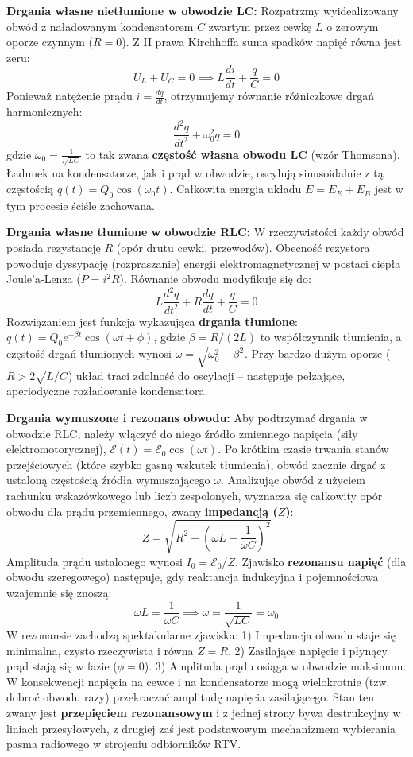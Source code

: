 \documentclass[11pt, a4paper]{article}
\begin{document}
\textbf{Drgania własne nietłumione w obwodzie LC:}
Rozpatrzmy wyidealizowany obwód z naładowanym kondensatorem $C$ zwartym przez cewkę $L$ o zerowym oporze czynnym ($R=0$). Z II prawa Kirchhoffa suma spadków napięć równa jest zeru:
\[
U_L + U_C = 0 \implies L \frac{di}{dt} + \frac{q}{C} = 0
\]
Ponieważ natężenie prądu $i = \frac{dq}{dt}$, otrzymujemy równanie różniczkowe drgań harmonicznych:
\[
\frac{d^2q}{dt^2} + \omega_0^2 q = 0
\]
gdzie $\omega_0 = \frac{1}{\sqrt{LC}}$ to tak zwana \textbf{częstość własna obwodu LC} (wzór Thomsona). Ładunek na kondensatorze, jak i prąd w obwodzie, oscylują sinusoidalnie z tą częstością $q(t) = Q_0 \cos(\omega_0 t)$. Całkowita energia układu $E = E_E + E_B$ jest w tym procesie ściśle zachowana.

\textbf{Drgania własne tłumione w obwodzie RLC:}
W rzeczywistości każdy obwód posiada rezystancję $R$ (opór drutu cewki, przewodów). Obecność rezystora powoduje dyssypację (rozpraszanie) energii elektromagnetycznej w postaci ciepła Joule'a-Lenza ($P = i^2 R$). Równanie obwodu modyfikuje się do:
\[
L \frac{d^2q}{dt^2} + R \frac{dq}{dt} + \frac{q}{C} = 0
\]
Rozwiązaniem jest funkcja wykazująca \textbf{drgania tłumione}: $q(t) = Q_0 e^{-\beta t} \cos(\omega t + \phi)$, gdzie $\beta = R/(2L)$ to współczynnik tłumienia, a częstość drgań tłumionych wynosi $\omega = \sqrt{\omega_0^2 - \beta^2}$. Przy bardzo dużym oporze ($R > 2\sqrt{L/C}$) układ traci zdolność do oscylacji – następuje pełzające, aperiodyczne rozładowanie kondensatora.

\textbf{Drgania wymuszone i rezonans obwodu:}
Aby podtrzymać drgania w obwodzie RLC, należy włączyć do niego źródło zmiennego napięcia (siły elektromotorycznej), $\mathcal{E}(t) = \mathcal{E}_0 \cos(\omega t)$. Po krótkim czasie trwania stanów przejściowych (które szybko gasną wskutek tłumienia), obwód zacznie drgać z ustaloną częstością źródła wymuszającego $\omega$. Analizując obwód z użyciem rachunku wskazówkowego lub liczb zespolonych, wyznacza się całkowity opór obwodu dla prądu przemiennego, zwany \textbf{impedancją ($Z$)}:
\[
Z = \sqrt{R^2 + \left(\omega L - \frac{1}{\omega C}\right)^2}
\]
Amplituda prądu ustalonego wynosi $I_0 = \mathcal{E}_0 / Z$.
Zjawisko \textbf{rezonansu napięć} (dla obwodu szeregowego) następuje, gdy reaktancja indukcyjna i pojemnościowa wzajemnie się znoszą:
\[
\omega L = \frac{1}{\omega C} \implies \omega = \frac{1}{\sqrt{LC}} = \omega_0
\]
W rezonansie zachodzą spektakularne zjawiska:
1) Impedancja obwodu staje się minimalna, czysto rzeczywista i równa $Z = R$.
2) Zasilające napięcie i płynący prąd stają się w fazie ($\phi = 0$).
3) Amplituda prądu osiąga w obwodzie maksimum. W konsekwencji napięcia na cewce i na kondensatorze mogą wielokrotnie (tzw. dobroć obwodu razy) przekraczać amplitudę napięcia zasilającego. Stan ten zwany jest \textbf{przepięciem rezonansowym} i z jednej strony bywa destrukcyjny w liniach przesyłowych, z drugiej zaś jest podstawowym mechanizmem wybierania pasma radiowego w strojeniu odbiorników RTV.
\end{document}
